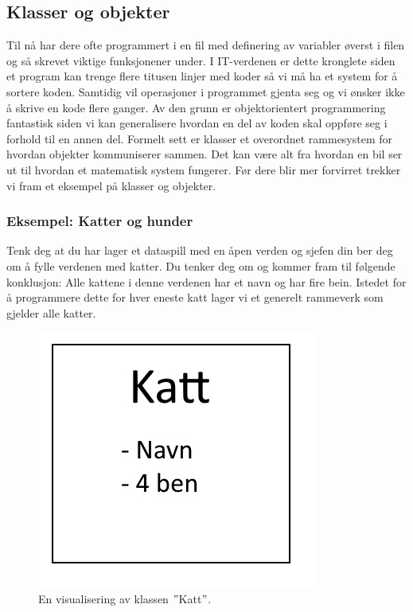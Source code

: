 \subsection{Klasser og objekter}
Til nå har dere ofte programmert i en fil med definering av variabler øverst i filen og så skrevet viktige funksjonener under. I IT-verdenen er dette kronglete siden et program kan trenge flere titusen linjer med koder så vi må ha et system for å sortere koden. Samtidig vil operasjoner i programmet gjenta seg og vi ønsker ikke å skrive en kode flere ganger. Av den grunn er objektorientert programmering fantastisk siden vi kan generalisere hvordan en del av koden skal oppføre seg i forhold til en annen del. Formelt sett er klasser et overordnet rammesystem for hvordan objekter kommuniserer sammen. Det kan være alt fra hvordan en bil ser ut til hvordan et matematisk system fungerer. Før dere blir mer forvirret trekker vi fram et eksempel på klasser og objekter.

\subsubsection{Eksempel: Katter og hunder}
Tenk deg at du har lager et dataspill med en åpen verden og sjefen din ber deg om å fylle verdenen med katter. Du tenker deg om og kommer fram til følgende konklusjon: Alle kattene i denne verdenen har et navn og har fire bein. Istedet for å programmere dette for hver eneste katt lager vi et generelt rammeverk som gjelder alle katter.

\begin{figure}[H]
    \centering
    \includegraphics[scale=0.5]{Figures/Klasser_katt.png}
    \caption{En visualisering av klassen $"$Katt$"$.}
    \label{fig:Katte_boks}
\end{figure}

